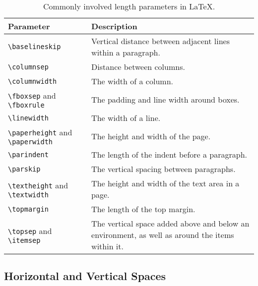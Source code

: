 \begin{table}
\begin{tabularx}{\textwidth}{|p{}|X|}
\hline
Parameter & Description \\
\hline
\texttt{\textbackslash baselineskip} & Vertical distance between adjacent lines within a paragraph.  \\
\hline
\texttt{\textbackslash columnsep} & Distance between columns. \\
\hline
\texttt{\textbackslash columnwidth} & The width of a column. \\
\hline
\texttt{\textbackslash fboxsep} and \texttt{\textbackslash fboxrule} & The padding and line width around boxes. \\
\hline
\texttt{\textbackslash linewidth} & The width of a line. \\
\hline
\texttt{\textbackslash paperheight} and \texttt{\textbackslash paperwidth} & The height and width of the page. \\
\hline
\texttt{\textbackslash parindent} & The length of the indent before a paragraph. \\
\hline
\texttt{\textbackslash parskip} & The vertical spacing between paragraphs. \\
\hline
\texttt{\textbackslash textheight} and \texttt{\textbackslash textwidth} & The height and width of the text area in a page. \\
\hline
\texttt{\textbackslash topmargin} & The length of the top margin. \\
\hline
\texttt{\textbackslash topsep} and \texttt{\textbackslash itemsep} & The vertical space added above and below an environment, as well as around the items within it. \\
\hline
\end{tabularx}
\caption{Commonly involved length parameters in \LaTeX{}.}
\label{tab:lengthpmt}
\end{table}

\subsection{Horizontal and Vertical Spaces}

